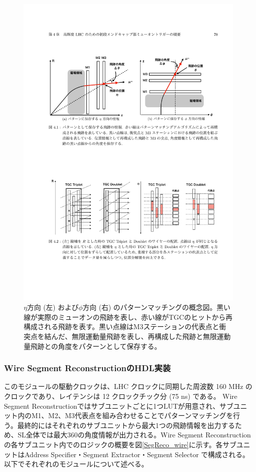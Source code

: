 \begin{figure} 
\centering
\includegraphics[width=16cm]{fig/SL/Concept_segment.pdf}
\caption[Segment Reconstructionのコンセプト]{$\eta$方向 (左) および$\phi$方向 (右) のパターンマッチングの概念図\cite{mt_mino}。黒い線が実際のミューオンの飛跡を表し、赤い線がTGCのヒットから再構成される飛跡を表す。黒い点線はM3ステーションの代表点と衝突点を結んだ、無限運動量飛跡を表し、再構成した飛跡と無限運動量飛跡との角度をパターンとして保存する。}
\label{Concept_segment}
\end{figure}

\subsubsection*{Wire Segment ReconstructionのHDL実装}
このモジュールの駆動クロックは、LHC クロックに同期した周波数 160 MHz のクロックであり、レイテンシは 12 クロックチック分 (75 ns) である。
Wire Segment Reconstructionではサブユニットごとに1つLUTが用意され、サブユニット内のM1、M2、M3代表点を組み合わせることでパターンマッチングを行う。最終的にはそれぞれのサブユニットから最大1つの飛跡情報を出力するため、SL全体では最大360の角度情報が出力される。Wire Segment Reconstructionの各サブユニット内でのロジックの概要を図\ref{SegReco_wire}に示す。各サブユニットはAddress Specifier・Segment Extractor・Segment Selector で構成される。以下でそれぞれのモジュールについて述べる。

